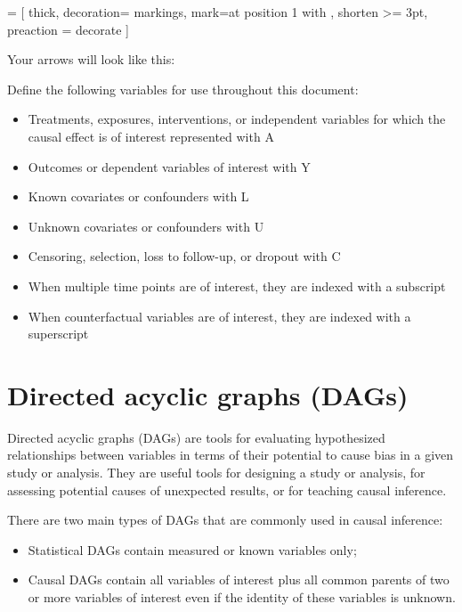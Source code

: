 \documentclass[a4paper]{report}
\begin{document}
 = [
	thick, 
	decoration={
		markings,
		mark=at position 1 with {
			}
		}, 
	shorten >= 3pt, preaction = {decorate}
	]

\vspace{3mm}	
Your arrows will look like this:

\vspace{3mm}

Define the following variables for use throughout this document:
\begin{itemize}
\item Treatments, exposures, interventions, or independent variables for which the causal effect is of interest  represented with A
\item Outcomes or dependent variables of interest with Y
\item Known covariates or confounders with L
\item Unknown covariates or confounders with U
\item Censoring, selection, loss to follow-up, or dropout with C
\item When multiple time points are of interest, they are indexed with a subscript
\item When counterfactual variables are of interest, they are indexed with a superscript
\end{itemize}

\vspace{5mm}

\chapter{Directed acyclic graphs (DAGs) }
Directed acyclic graphs (DAGs) are tools for evaluating hypothesized relationships between variables in terms of their potential to cause bias in a given study or analysis. They are useful tools for designing a study or analysis, for assessing potential causes of unexpected results, or for teaching causal inference. 
\vspace{3mm}

There are two main types of DAGs that are commonly used in causal inference:
\begin{itemize}
\item Statistical DAGs contain measured or known variables only;
\item Causal DAGs contain all variables of interest plus all common parents of two or more variables of interest even if the identity of these variables is unknown. 
\end{itemize}
\vspace{3mm}
\end{document}

